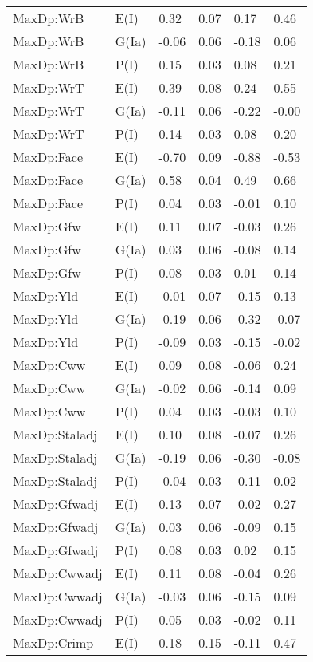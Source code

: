 \begin{center}
\begin{longtable}{|p{1.1in}|p{0.7in}|p{0.7in}|p{0.6in}|p{0.6in}|p{0.6in}|}
  MaxDp:WrB & E(I) & 0.32 & 0.07 & 0.17 & 0.46 \\ 
  MaxDp:WrB & G(Ia) & -0.06 & 0.06 & -0.18 & 0.06 \\ 
  MaxDp:WrB & P(I) & 0.15 & 0.03 & 0.08 & 0.21 \\ 
  MaxDp:WrT & E(I) & 0.39 & 0.08 & 0.24 & 0.55 \\ 
  MaxDp:WrT & G(Ia) & -0.11 & 0.06 & -0.22 & -0.00 \\ 
  MaxDp:WrT & P(I) & 0.14 & 0.03 & 0.08 & 0.20 \\ 
  MaxDp:Face & E(I) & -0.70 & 0.09 & -0.88 & -0.53 \\ 
  MaxDp:Face & G(Ia) & 0.58 & 0.04 & 0.49 & 0.66 \\ 
  MaxDp:Face & P(I) & 0.04 & 0.03 & -0.01 & 0.10 \\ 
  MaxDp:Gfw & E(I) & 0.11 & 0.07 & -0.03 & 0.26 \\ 
  MaxDp:Gfw & G(Ia) & 0.03 & 0.06 & -0.08 & 0.14 \\ 
  MaxDp:Gfw & P(I) & 0.08 & 0.03 & 0.01 & 0.14 \\ 
  MaxDp:Yld & E(I) & -0.01 & 0.07 & -0.15 & 0.13 \\ 
  MaxDp:Yld & G(Ia) & -0.19 & 0.06 & -0.32 & -0.07 \\ 
  MaxDp:Yld & P(I) & -0.09 & 0.03 & -0.15 & -0.02 \\ 
  MaxDp:Cww & E(I) & 0.09 & 0.08 & -0.06 & 0.24 \\ 
  MaxDp:Cww & G(Ia) & -0.02 & 0.06 & -0.14 & 0.09 \\ 
  MaxDp:Cww & P(I) & 0.04 & 0.03 & -0.03 & 0.10 \\ 
  MaxDp:Staladj & E(I) & 0.10 & 0.08 & -0.07 & 0.26 \\ 
  MaxDp:Staladj & G(Ia) & -0.19 & 0.06 & -0.30 & -0.08 \\ 
  MaxDp:Staladj & P(I) & -0.04 & 0.03 & -0.11 & 0.02 \\ 
  MaxDp:Gfwadj & E(I) & 0.13 & 0.07 & -0.02 & 0.27 \\ 
  MaxDp:Gfwadj & G(Ia) & 0.03 & 0.06 & -0.09 & 0.15 \\ 
  MaxDp:Gfwadj & P(I) & 0.08 & 0.03 & 0.02 & 0.15 \\ 
  MaxDp:Cwwadj & E(I) & 0.11 & 0.08 & -0.04 & 0.26 \\ 
  MaxDp:Cwwadj & G(Ia) & -0.03 & 0.06 & -0.15 & 0.09 \\ 
  MaxDp:Cwwadj & P(I) & 0.05 & 0.03 & -0.02 & 0.11 \\ 
  MaxDp:Crimp & E(I) & 0.18 & 0.15 & -0.11 & 0.47 \\ 

\end{longtable}
\end{center}
